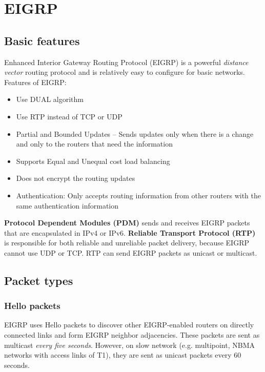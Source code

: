 \chapter{EIGRP}

\section{Basic features}

Enhanced Interior Gateway Routing Protocol (EIGRP) is a powerful \emph{distance vector} routing protocol and is relatively easy to configure for basic networks. Features of EIGRP:

\begin{itemize}
\item Use DUAL algorithm
\item Use RTP  instead of TCP or UDP
\item Partial and Bounded Updates -- Sends updates only when there is a change and only to the routers that need the information
\item Supports Equal and Unequal cost load balancing
\item Does not encrypt the routing updates
\item Authentication: Only accepts routing information from other routers with the same authentication information 
\end{itemize}

\textbf{Protocol Dependent Modules (PDM)} sends and receives EIGRP packets that are encapsulated in IPv4 or IPv6. \textbf{Reliable Transport Protocol (RTP)} is responsible for both reliable and unreliable packet delivery, because EIGRP cannot use UDP or TCP. RTP can send EIGRP packets as unicast or multicast.

\section{Packet types}

\subsection{Hello packets}

EIGRP uses Hello packets to discover other EIGRP-enabled routers on directly connected links and form EIGRP neighbor adjacencies. These packets are sent as multicast \emph{every five seconds}. However, on slow network (e.g. multipoint, NBMA networks with access links of T1), they are sent as unicast packets every 60 seconds.\\
 
